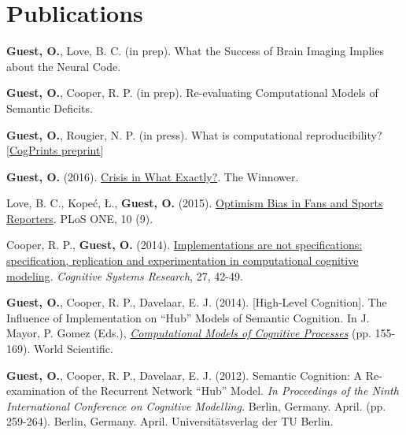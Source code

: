 



\section{Publications}

\begin{outerlist}

\item[] \textbf{Guest, O.}, Love, B. C. (in prep). What the Success of Brain Imaging Implies about the Neural Code.

\item[] \textbf{Guest, O.}, Cooper, R. P. (in prep). Re-evaluating Computational Models of Semantic Deficits.

\item[] \textbf{Guest, O.}, Rougier, N. P. (in press). What is computational reproducibility? [\href{http://cogprints.org/10135/}{CogPrints preprint}]

\item[] \textbf{Guest, O.} (2016). \href{http://dx.doi.org/10.15200/winn.146590.01538}{Crisis in What Exactly?}. The Winnower. 

\item[] Love, B. C., Kopeć, Ł., \textbf{Guest, O.} (2015). \href{http://dx.doi.org/10.1371/journal.pone.0137685}{Optimism Bias in Fans and Sports Reporters}. PLoS ONE, 10 (9).


\item[] Cooper, R. P., \textbf{Guest, O.} (2014).  \href{http://dx.doi.org/10.1016/j.cogsys.2013.05.001}{Implementations are not specifications: specification, replication and experimentation in computational cognitive modeling}. \textit{Cognitive Systems Research}, 27, 42-49.





\item[] \textbf{Guest, O.}, Cooper, R. P., Davelaar, E. J. (2014).  [High-Level Cognition]. The Influence of Implementation on ``Hub'' Models of Semantic Cognition. In J. Mayor, P. Gomez (Eds.), \textit{\href{http://www.worldscientific.com/worldscibooks/10.1142/8747}{Computational Models of Cognitive Processes}} (pp. 155-169). World Scientific.

\item[]  \textbf{Guest, O.}, Cooper, R. P., Davelaar, E. J. (2012). Semantic Cognition: A Re-examination of the Recurrent Network ``Hub'' Model. \textit{In Proceedings of the Ninth International Conference on Cognitive Modelling.} Berlin, Germany. April. (pp. 259-264). Berlin, Germany. April. Universit\"{a}tsverlag der TU Berlin.
\end{outerlist}


